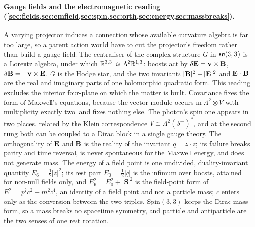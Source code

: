 \paragraph{Gauge fields and the electromagnetic reading (\cref{sec:fields,sec:emfield,sec:spin,sec:orth,sec:energy,sec:massbreaks}).} A varying
projector induces a connection whose available curvature algebra is far too large, so a parent action would have to cut
the projector's freedom rather than build a gauge field. The centraliser of the complex structure $G$ in $\mathfrak{so}(3,3)$ is a
Lorentz algebra, under which $\mathbb{R}^{3,3}$ \emph{is} $\Lambda^2\mathbb{R}^{1,3}$: boosts act by $\delta\mathbf E=\mathbf v\times\mathbf B$,
$\delta\mathbf B=-\mathbf v\times\mathbf E$, $G$ is the Hodge star, and the two invariants $|\mathbf B|^2-|\mathbf E|^2$ and $\mathbf E\cdot\mathbf B$ are the real
and imaginary parts of one holomorphic quadratic form. This reading excludes the interior four-plane on which the matter
is built. Covariance fixes the form of Maxwell's equations, because the vector module occurs in $\Lambda^2\otimes V$ with
multiplicity exactly two, and fixes nothing else. The photon's spin one appears in two places, related by the Klein
correspondence $V\cong\Lambda^2(S^+)^*$, and at the second rung both can be coupled to a Dirac block in a single gauge
theory. The orthogonality of $\mathbf E$ and $\mathbf B$ is the reality of the invariant $q=z\cdot z$; its failure breaks parity and time
reversal, is never spontaneous for the Maxwell energy, and does not generate mass. The energy of a field point is one undivided, duality-invariant
quantity $E_6=\tfrac12|z|^2$; its rest part $E_0=\tfrac12|q|$ is the infimum over boosts, attained for non-null fields only, and
$E_6^2=E_0^2+|\mathbf S|^2$ is the field-point form of $E^2=p^2c^2+m^2c^4$, an identity of a field point and not a particle mass; $c$ enters only as
the conversion between the two triples. $\mathrm{Spin}(3,3)$ keeps the Dirac mass form, so
a mass breaks no spacetime symmetry, and particle and antiparticle are the two senses of one rest rotation.


